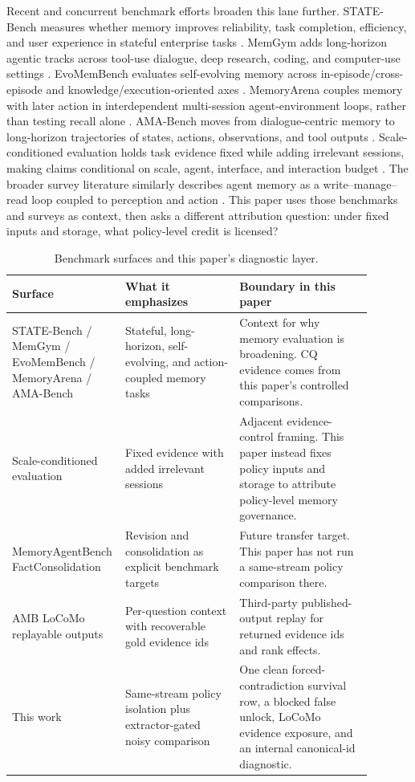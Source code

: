 Recent and concurrent benchmark efforts broaden this lane further. STATE-Bench
measures whether memory improves reliability, task completion, efficiency, and
user experience in stateful enterprise tasks \cite{statebench2026}. MemGym
adds long-horizon agentic tracks across tool-use dialogue, deep research,
coding, and computer-use settings \cite{memgym2026}. EvoMemBench evaluates
self-evolving memory across in-episode/cross-episode and
knowledge/execution-oriented axes \cite{evomembench2026}. MemoryArena couples
memory with later action in interdependent multi-session agent-environment
loops, rather than testing recall alone \cite{memoryarena2026}. AMA-Bench moves
from dialogue-centric memory to long-horizon trajectories of states, actions,
observations, and tool outputs \cite{amabench2026}. Scale-conditioned
evaluation holds task evidence fixed while adding irrelevant sessions, making
claims conditional on scale, agent, interface, and interaction budget
\cite{scaleconditioned2026}. The broader survey literature similarly describes
agent memory as a write--manage--read loop coupled to perception and action
\cite{memorysurvey2026}. This paper uses those benchmarks and surveys as
context, then asks a different attribution question: under fixed inputs and
storage, what policy-level credit is licensed?

\begin{table}[H]
\centering
\caption{Benchmark surfaces and this paper's diagnostic layer.}
\label{tab:benchmark-comparison}
\small
\begin{tabular}{p{0.22\linewidth} p{0.31\linewidth} p{0.36\linewidth}}
\toprule
Surface & What it emphasizes & Boundary in this paper\\
\midrule
STATE-Bench / MemGym / EvoMemBench / MemoryArena / AMA-Bench &
Stateful, long-horizon, self-evolving, and action-coupled memory tasks &
Context for why memory evaluation is broadening. CQ evidence comes from this
paper's controlled comparisons.\\
\addlinespace
Scale-conditioned evaluation &
Fixed evidence with added irrelevant sessions &
Adjacent evidence-control framing. This paper instead fixes policy inputs and
storage to attribute policy-level memory governance.\\
\addlinespace
MemoryAgentBench FactConsolidation &
Revision and consolidation as explicit benchmark targets &
Future transfer target. This paper has not run a same-stream policy comparison
there.\\
\addlinespace
AMB LoCoMo replayable outputs &
Per-question context with recoverable gold evidence ids &
Third-party published-output replay for returned evidence ids and rank
effects.\\
\addlinespace
This work &
Same-stream policy isolation plus extractor-gated noisy comparison &
One clean forced-contradiction survival row, a blocked false unlock, LoCoMo evidence
exposure, and an internal canonical-id diagnostic.\\
\bottomrule
\end{tabular}
\end{table}

